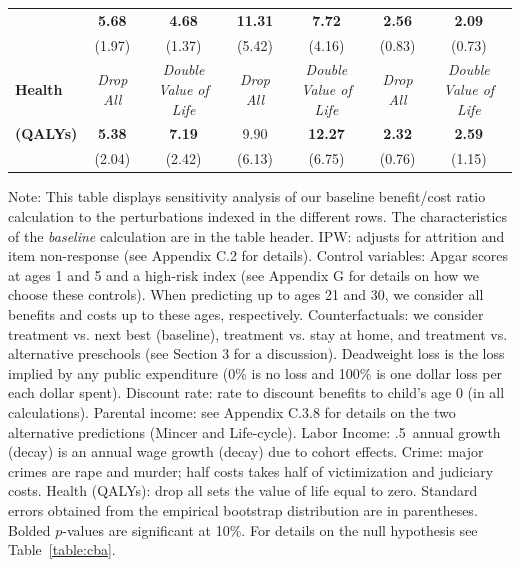 \documentclass[static]{JJH-Beamer}
\begin{document}
\begin{frame}
\begin{table}[H]
\begin{center}
{\begin{tabular}{>{\bfseries}lcc|cc|cc}
	&	\textbf{5.68}	&	\textbf{4.68}	&	\textbf{11.31}	&	\textbf{7.72}	&	\textbf{2.56}	&	\textbf{2.09}	\\
	&	(1.97)	&	(1.37)	&	(5.42)	&	(4.16)	&	(0.83)	&	(0.73)	\\ \midrule
Health	&	\textit{Drop All}	&	\textit{Double Value of Life}	&	\textit{Drop All}	&	\textit{Double Value of Life}	&	\textit{Drop All}	&	\textit{Double Value of Life}	\\
(QALYs)	&	\textbf{5.38}	&	\textbf{7.19}	&	9.90	&	\textbf{12.27}	&	\textbf{2.32}	&	\textbf{2.59}	\\
	&	(2.04)	&	(2.42)	&	(6.13)	&	(6.75)	&	(0.76)	&	(1.15)	\\ \bottomrule
\end{tabular}
}
\end{center}
\end{table}

\end{frame}

{\flushleft \small Note: This table displays sensitivity analysis of our baseline benefit/cost ratio calculation to the perturbations indexed in the different rows. The characteristics of the \textit{baseline} calculation are in the table header. IPW: adjusts for attrition and item non-response (see Appendix C.2 for details). Control variables: Apgar scores at ages 1 and 5 and a high-risk index (see Appendix G for details on how we choose these controls). When predicting up to ages 21 and 30, we consider all benefits and costs up to these ages, respectively. Counterfactuals: we consider treatment vs. next best (baseline), treatment vs. stay at home, and treatment vs. alternative preschools (see Section 3 for a discussion). Deadweight loss is the loss implied by any public expenditure (0\% is no loss and 100\% is one dollar loss per each dollar spent). Discount rate: rate to discount benefits to child's age 0 (in all calculations). Parental income: see Appendix C.3.8 for details on the two alternative predictions (Mincer and Life-cycle). Labor Income: .5\ annual growth (decay) is an annual wage growth (decay) due to cohort effects. Crime: major crimes are rape and murder; half costs takes half of victimization and judiciary costs. Health (QALYs): drop all sets the value of life equal to zero. Standard errors obtained from the empirical bootstrap distribution are in parentheses. Bolded $p$-values are significant at 10\%. For details on the null hypothesis see Table~\ref{table:cba}.\\}
\end{document}
